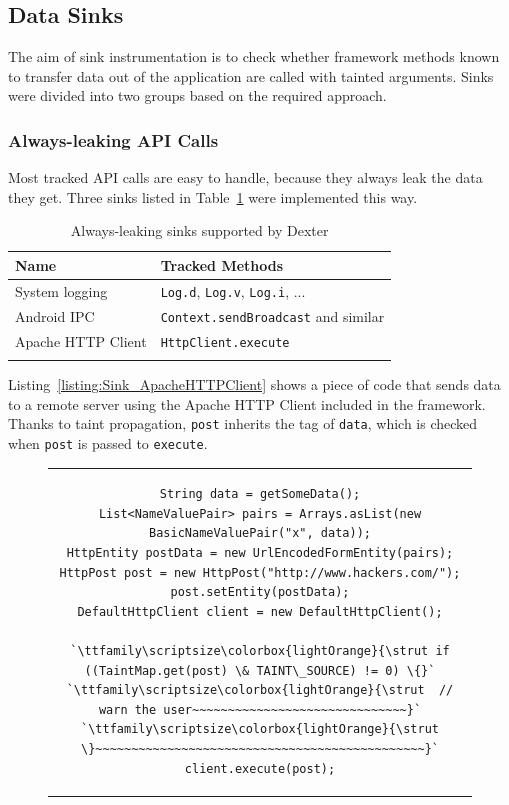 \documentclass[12pt,twoside,notitlepage]{report}
\newcommand{\highlight}[1]{\colorbox{lightOrange}{\strut #1}}
\newcommand{\lsthl}[1] {\ttfamily\scriptsize\highlight{#1}}
\begin{document}
\subsection{Data Sinks}

The aim of sink instrumentation is to check whether framework methods known to transfer data out of the application are called with tainted arguments. Sinks were divided into two groups based on the required approach.

\subsubsection{Always-leaking API Calls}

Most tracked API calls are easy to handle, because they always leak the data they get. Three sinks listed in Table~\ref{table:Sinks_AlwaysLeaking} were implemented this way.

\begin{table}[h]
	\begin{center}
	\begin{tabular}{|l|l|}
		\firsthline
		\textbf{Name}         & \textbf{Tracked Methods} \\
		\hline
		System logging        & \verb$Log.d$, \verb$Log.v$, \verb$Log.i$, ... \\
		Android IPC           & \verb$Context.sendBroadcast$ and similar \\
		Apache HTTP Client    & \verb$HttpClient.execute$ \\
		\lasthline
	\end{tabular}
	\end{center}
	\caption{Always-leaking sinks supported by Dexter}
	\label{table:Sinks_AlwaysLeaking}
\end{table}

Listing~\ref{listing:Sink_ApacheHTTPClient} shows a piece of code that sends data to a remote server using the Apache HTTP Client included in the framework. Thanks to taint propagation, \verb$post$ inherits the tag of \verb$data$, which is checked when \verb$post$ is passed to \verb$execute$.

\begin{figure}[h]
	\centering
	\begin{tabular}{c}
	\begin{lstlisting}
String data = getSomeData();
List<NameValuePair> pairs = Arrays.asList(new BasicNameValuePair("x", data));
HttpEntity postData = new UrlEncodedFormEntity(pairs);
HttpPost post = new HttpPost("http://www.hackers.com/");
post.setEntity(postData);
DefaultHttpClient client = new DefaultHttpClient();

`\lsthl{if ((TaintMap.get(post) \& TAINT\_SOURCE) != 0) \{}`
`\lsthl{ // warn the user~~~~~~~~~~~~~~~~~~~~~~~~~~~~~~}`
`\lsthl{\}~~~~~~~~~~~~~~~~~~~~~~~~~~~~~~~~~~~~~~~~~~~~~~}`
client.execute(post);
	\end{lstlisting}
	\end{tabular}
	\begin{lstlisting}[caption={HTTP request using the Apache client, with sink instrumentation},
	                   label={listing:Sink_ApacheHTTPClient}]
	\end{lstlisting}
\end{figure}
\end{document}
